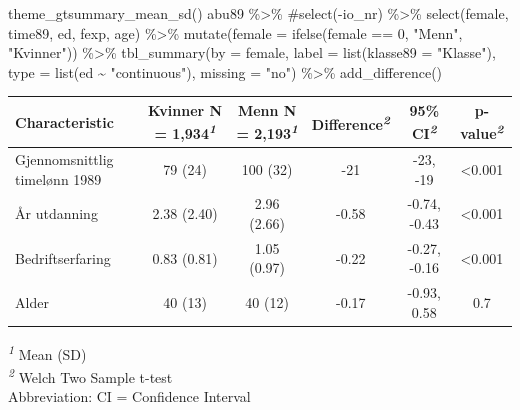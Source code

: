 \documentclass[
  norsk,
  letterpaper,
  DIV=11,
  numbers=noendperiod]{scrreprt}
\newenvironment{Shaded}{\begin{snugshade}}{\end{snugshade}}
\newcommand{\AttributeTok}[1]{\textcolor[rgb]{0.40,0.45,0.13}{#1}}
\newcommand{\CommentTok}[1]{\textcolor[rgb]{0.37,0.37,0.37}{#1}}
\newcommand{\DecValTok}[1]{\textcolor[rgb]{0.68,0.00,0.00}{#1}}
\newcommand{\FunctionTok}[1]{\textcolor[rgb]{0.28,0.35,0.67}{#1}}
\newcommand{\NormalTok}[1]{\textcolor[rgb]{0.00,0.23,0.31}{#1}}
\newcommand{\SpecialCharTok}[1]{\textcolor[rgb]{0.37,0.37,0.37}{#1}}
\newcommand{\StringTok}[1]{\textcolor[rgb]{0.13,0.47,0.30}{#1}}
\theoremstyle{definition}
\theoremstyle{remark}
\begin{document}
\begin{Shaded}
\begin{Highlighting}[]
\FunctionTok{theme\_gtsummary\_mean\_sd}\NormalTok{()}
\NormalTok{abu89 }\SpecialCharTok{\%\textgreater{}\%} 
  \CommentTok{\#select({-}io\_nr) \%\textgreater{}\%}
  \FunctionTok{select}\NormalTok{(female, time89, ed,  fexp, age) }\SpecialCharTok{\%\textgreater{}\%} 
  \FunctionTok{mutate}\NormalTok{(}\AttributeTok{female =} \FunctionTok{ifelse}\NormalTok{(female }\SpecialCharTok{==} \DecValTok{0}\NormalTok{, }\StringTok{"Menn"}\NormalTok{, }\StringTok{"Kvinner"}\NormalTok{)) }\SpecialCharTok{\%\textgreater{}\%} 
    \FunctionTok{tbl\_summary}\NormalTok{(}\AttributeTok{by =}\NormalTok{ female, }
                \AttributeTok{label =} \FunctionTok{list}\NormalTok{(}\AttributeTok{klasse89 =} \StringTok{"Klasse"}\NormalTok{), }
              \AttributeTok{type =} \FunctionTok{list}\NormalTok{(ed }\SpecialCharTok{\textasciitilde{}} \StringTok{"continuous"}\NormalTok{), }
              \AttributeTok{missing =} \StringTok{"no"}\NormalTok{) }\SpecialCharTok{\%\textgreater{}\%} 
  \FunctionTok{add\_difference}\NormalTok{() }
\end{Highlighting}
\end{Shaded}

\begin{table}
\fontsize{12.0pt}{14.0pt}\selectfont
\begin{tabular*}{\linewidth}{@{\extracolsep{\fill}}lccccc}
\toprule
\textbf{Characteristic} & \textbf{Kvinner}  N = 1,934\textsuperscript{\textit{1}} & \textbf{Menn}  N = 2,193\textsuperscript{\textit{1}} & \textbf{Difference}\textsuperscript{\textit{2}} & \textbf{95\% CI}\textsuperscript{\textit{2}} & \textbf{p-value}\textsuperscript{\textit{2}} \\ 
\midrule\addlinespace[2.5pt]
Gjennomsnittlig timelønn 1989 & 79 (24) & 100 (32) & -21 & -23, -19 & <0.001 \\ 
År utdanning & 2.38 (2.40) & 2.96 (2.66) & -0.58 & -0.74, -0.43 & <0.001 \\ 
Bedriftserfaring & 0.83 (0.81) & 1.05 (0.97) & -0.22 & -0.27, -0.16 & <0.001 \\ 
Alder & 40 (13) & 40 (12) & -0.17 & -0.93, 0.58 & 0.7 \\ 
\bottomrule
\end{tabular*}
\begin{minipage}{\linewidth}
\vspace{.05em}
\textsuperscript{\textit{1}} Mean (SD)\\
\textsuperscript{\textit{2}} Welch Two Sample t-test\\
Abbreviation: CI = Confidence Interval\\
\end{minipage}
\end{table}
\end{document}
